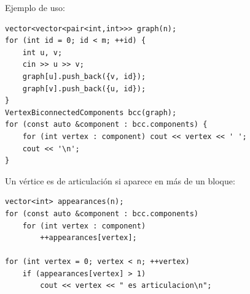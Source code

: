 Ejemplo de uso:

\begin{lstlisting}[style=cpp]
vector<vector<pair<int,int>>> graph(n);
for (int id = 0; id < m; ++id) {
    int u, v;
    cin >> u >> v;
    graph[u].push_back({v, id});
    graph[v].push_back({u, id});
}
VertexBiconnectedComponents bcc(graph);
for (const auto &component : bcc.components) {
    for (int vertex : component) cout << vertex << ' ';
    cout << '\n';
}
\end{lstlisting}

Un vértice es de articulación si aparece en más de un bloque:

\begin{lstlisting}[style=cpp]
vector<int> appearances(n);
for (const auto &component : bcc.components)
    for (int vertex : component)
        ++appearances[vertex];

for (int vertex = 0; vertex < n; ++vertex)
    if (appearances[vertex] > 1)
        cout << vertex << " es articulacion\n";
\end{lstlisting}

